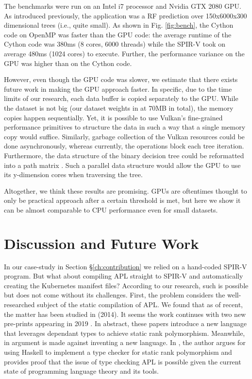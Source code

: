 \documentclass{IEEEtran}
\begin{document}
The benchmarks were run on an Intel i7 processor and Nvidia GTX 2080 GPU. As introduced previously, the application was a \gls{RF} prediction over 150x6000x300 dimensional trees (i.e., quite small). As shown in Fig. \ref{fig:bench}, the Cython code on OpenMP was faster than the GPU code: the average runtime of the Cython code was 380ms (8 cores, 6000 threads) while the SPIR-V took on average 480ms (1024 cores) to execute. Further, the performance variance on the GPU was higher than on the Cython code.

However, even though the GPU code was slower, we estimate that there exists future work in making the GPU approach faster. In specific, due to the time limits of our research, each data buffer is copied separately to the GPU. While the dataset is not big (our dataset weights in at 70MB in total), the memory copies happen sequentially. Yet, it is possible to use Vulkan's fine-grained performance primitives to structure the data in such a way that a single memory copy would suffice. Similarly, garbage collection of the Vulkan resources could be done asynchronously, whereas currently, the operations block each tree iteration. Furthermore, the data structure of the binary decision tree could be reformatted into a path matrix \cite{hsu2016key}. Such a parallel data structure would allow the GPU to use its y-dimension cores when traversing the tree. 

Altogether, we think these results are promising. GPUs are oftentimes thought to only be practical approach after a certain threshold is met, but here we show it can be almost comparable to CPU performance even for small datasets.

\section{Discussion and Future Work}
\label{ch:dicussion}

In our case-study in Section §\ref{ch:contribution} we relied on a hand-coded SPIR-V program. But what about compiling APL straight to SPIR-V and automatically creating the Kubernetes manifest files? According to our research, such is possible but does not come without its challenges. First, the problem considers the well-researched subject of the static compilation of APL. We found that as of recent, the matter has been studied in \cite{slepak2014array} (2014). It seems the work continues with two new pre-prints appearing in 2019 \cite{slepak2019semantics, shivers2019introduction}. In abstract, these papers introduce a new language that leverages dependant types to achieve static rank polymorphism. Meanwhile, in \cite{gibbons2017aplicative} argument is made against inventing a new language. In \cite{gibbons2017aplicative}, the author argues for using Haskell to implement a type checker for static rank polymorphism and provides proof that the issue of type checking APL is possible given the current state of programming language theory and its tools.
\end{document}

